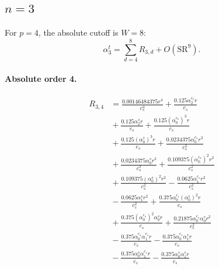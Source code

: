 \documentclass[10pt]{article}
\begin{document}
\subsection{$n=3$}
For $p=4$, the absolute cutoff is $W=8$:
\[\alpha_{3}^t=\sum_{d=4}^{8}R_{3,d}+O(\mathrm{SR}^{9}).\]
\paragraph{Absolute order 4.}
\begin{align*}
R_{3,4} &= \frac{0.00146484375 r^{4}}{c_{s}^{4}} + \frac{0.125 \alpha_{2}^{c_s} r}{c_{s}} \\
&{}  + \frac{0.125 \alpha_{2}^s r}{c_{s}} + \frac{0.125 \left(\alpha_{0}^{c_s}\right)^{3} r}{c_{s}} \\
&{}  + \frac{0.125 \left(\alpha_{0}^s\right)^{3} r}{c_{s}} + \frac{0.0234375 \alpha_{0}^{c_s} r^{3}}{c_{s}^{3}} \\
&{}  + \frac{0.0234375 \alpha_{0}^s r^{3}}{c_{s}^{3}} + \frac{0.109375 \left(\alpha_{0}^{c_s}\right)^{2} r^{2}}{c_{s}^{2}} \\
&{}  + \frac{0.109375 \left(\alpha_{0}^s\right)^{2} r^{2}}{c_{s}^{2}} - \frac{0.0625 \alpha_{1}^{c_s} r^{2}}{c_{s}^{2}} \\
&{}  - \frac{0.0625 \alpha_{1}^s r^{2}}{c_{s}^{2}} + \frac{0.375 \alpha_{0}^{c_s} \left(\alpha_{0}^s\right)^{2} r}{c_{s}} \\
&{}  + \frac{0.375 \left(\alpha_{0}^{c_s}\right)^{2} \alpha_{0}^s r}{c_{s}} + \frac{0.21875 \alpha_{0}^{c_s} \alpha_{0}^s r^{2}}{c_{s}^{2}} \\
&{}  - \frac{0.375 \alpha_{0}^{c_s} \alpha_{1}^{c_s} r}{c_{s}} - \frac{0.375 \alpha_{0}^{c_s} \alpha_{1}^s r}{c_{s}} \\
&{}  - \frac{0.375 \alpha_{0}^s \alpha_{1}^{c_s} r}{c_{s}} - \frac{0.375 \alpha_{0}^s \alpha_{1}^s r}{c_{s}}
\end{align*}
\end{document}

